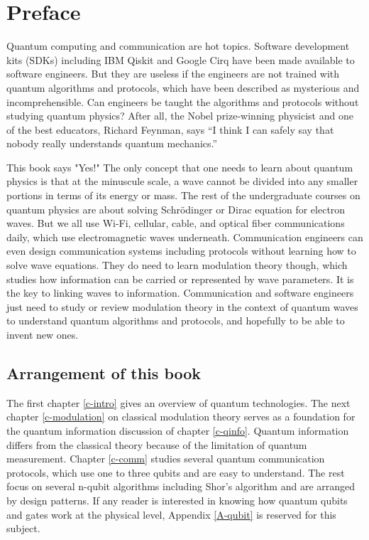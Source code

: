 \documentclass[oneside, letter, 12pt]{book}
\begin{document}



\chapter*{Preface}
Quantum computing and communication are hot topics. Software development kits (SDKs) including IBM Qiskit and Google Cirq have been made available to software engineers. But they are useless if the engineers are not trained with quantum algorithms and protocols, which have been described as mysterious and incomprehensible. Can engineers be taught the algorithms and protocols without studying quantum physics? After all, the Nobel prize-winning physicist and one of the best educators, Richard Feynman, says “I think I can safely say that nobody really understands quantum mechanics.”

This book says "Yes!" The only concept that one needs to learn about quantum physics is that at the minuscule scale, a wave cannot be divided into any smaller portions in terms of its energy or mass. The rest of the undergraduate courses on quantum physics are about solving Schrödinger or Dirac equation for electron waves. But we all use Wi-Fi, cellular, cable, and optical fiber communications daily, which use electromagnetic waves underneath. Communication engineers can even design communication systems including protocols without learning how to solve wave equations. They do need to learn modulation theory though, which studies how information can be carried or represented by wave parameters. It is the key to linking waves to information. Communication and software engineers just need to study or review modulation theory in the context of quantum waves to understand quantum algorithms and protocols, and hopefully to be able to invent new ones.

\section{Arrangement of this book}
The first chapter \ref{c-intro} gives an overview of quantum technologies. The next chapter \ref{c-modulation} on classical modulation theory serves as a foundation for the quantum information discussion of chapter \ref{c-qinfo}. Quantum information differs from the classical theory because of the limitation of quantum measurement. Chapter \ref{c-comm} studies several quantum communication protocols, which use one to three qubits and are easy to understand. The rest focus on several n-qubit algorithms including Shor's algorithm and are arranged by design patterns. If any reader is interested in knowing how quantum qubits and gates work at the physical level, Appendix \ref{A-qubit} is reserved for this subject.
\end{document}
